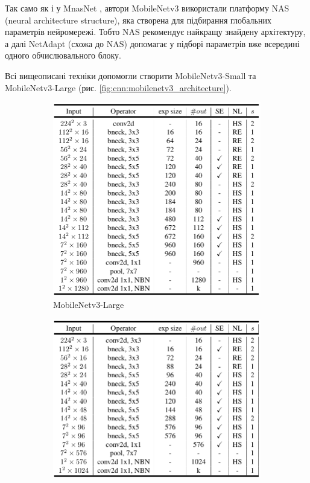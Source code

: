 Так само як і у MnasNet \cite{mnasnet}, автори MobileNetv3 використали платформу NAS (neural
architecture structure), яка створена для підбирання глобальних параметрів нейромережі.
Тобто NAS рекомендує найкращу знайдену архітектуру, а далі NetAdapt \cite{netadapt} (схожа до NAS) допомагає у підборі
параметрів вже всередині одного обчислювального блоку.

Всі вищеописані техніки допомогли створити MobileNetv3-Small та MobileNetv3-Large
(рис. \ref{fig:cnn:mobilenetv3_architecture}).

\begin{figure}[H]
    \centering
    \begin{subfigure}[c]{0.4\textwidth}
        \centering
        \includegraphics[width=\textwidth]{images/cnn_mobilenetv3_large_architecture}
        \caption{MobileNetv3-Large
        }
    \end{subfigure}
    \begin{subfigure}[c]{0.4\textwidth}
        \centering
        \includegraphics[width=\textwidth]{images/cnn_mobilenetv3_small_architecture}

\end{subfigure}
\end{figure}
